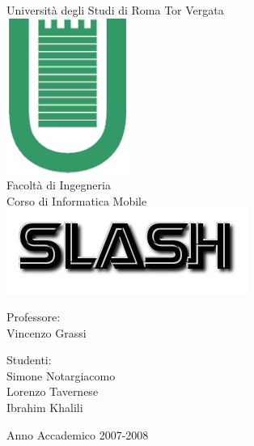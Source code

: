 \begin{titlepage}
\begin{center}
\LARGE{Università degli Studi di Roma Tor Vergata}\\
\vspace{10mm}
\includegraphics[scale=0.50]{etc/logo.jpg}\\
Facoltà di Ingegneria\\
\vspace{5mm}
\normalsize{Corso di Informatica Mobile}\\
\vspace{20mm}
\includegraphics[scale=0.60]{etc/slash.jpg}\\
\end{center}
\vspace{40mm}
\begin{minipage}[t]{0.30\textwidth}
\begin{center}
{\normalsize{Professore:\\
Vincenzo Grassi}}
\end{center}
\end{minipage}
\hfill
\begin{minipage}[t]{0.30\textwidth}
\begin{center}
{\normalsize{Studenti:\\
Simone Notargiacomo\\
Lorenzo Tavernese\\
Ibrahim Khalili}}
\end{center}
\end{minipage}
\vspace{10mm}
\begin{center}
Anno Accademico 2007-2008
\end{center}

\end{titlepage}
